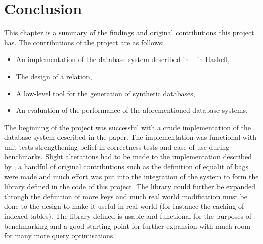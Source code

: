 \chapter{Conclusion}
\begin{comment}
Conclusions and Future Work
The project's conclusions should summarise the key insights that have been gained, be they positive or negative. For example, "The use of overloading in C++ provides a very elegant mechanism for transparent parallelisation of sequential programs", or "The overheads of linear-time n-body algorithms makes them computationally less efficient than O(n log n) algorithms for systems with less than 100000 particles". Avoid tedious personal reflections like "I learned a lot about C++ programming...". It is common to finish the report by listing ways in which the project can be taken further. This might, for example, be a plan for doing the project better if you could do a re-run, turning the project deliverables into a more polished end product, or extending the project into a programme for an MPhil or PhD.
\end{comment}
This chapter is a summary of the findings and original contributions this
project has. The contributions of the project are as follows:
\begin{itemize}
    \item An implementation of the database system described in
        \relalg{}~\cite{RelationalAlgebraByWayOfAdjunctions} in Haskell,
    \item The design of a  relation,
    \item A low-level tool for the generation of synthetic databases,
    \item An evaluation of the performance of the aforementioned database
        systems.
\end{itemize}

The beginning of the project was successful with a crude implementation of the
database system described in the paper. The implementation was functional with
unit tests strengthening belief in correctness tests and ease of use during
benchmarks. Slight alterations had to be made to the implementation described by
\relalg{}, a handful of original contributions such as the definition of equalit
of bags were made and much effort was put into the integration of the system to form the
library defined in the code of this project. The library could further be
expanded through the definition of more keys and much real world modification
must be done to the design to make it useful in real world (for instance the
caching of indexed tables). The library defined is usable and functional for the
purposes of benchmarking and a good starting point for further expansion with
much room for many more query optimisations.

